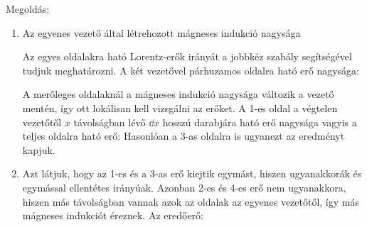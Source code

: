 
\ifdefined\megoldas

 Megoldás: 

 \begin{enumerate}[label=\alph*),itemsep=0pt]
  \item 
   Az egyenes vezető által létrehozott mágneses indukció nagysága
   
   Az egyes oldalakra ható Lorentz-erők irányát a jobbkéz szabály segítségével tudjuk meghatározni. A két vezetővel párhuzamos oldalra ható erő nagysága:
   
   A merőleges oldalaknál a mágneses indukció nagysága változik a vezető mentén, így ott lokálisan kell vizsgálni az erőket. A 1-es oldal a végtelen vezetőtől $x$ távolságban lévő $\dd x$ hosszú darabjára ható erő nagysága
   vagyis a teljes oldalra ható erő:
   Hasonlóan a 3-as oldalra is ugyanezt az eredményt kapjuk.
   
  \item
   Azt látjuk, hogy az 1-es és a 3-as erő kiejtik egymást, hiszen ugyanakkorák és egymással ellentétes irányúak. Azonban 2-es és 4-es erő nem ugyanakkora, hiszen más távolságban vannak azok az oldalak az egyenes vezetőtől, így más mágneses indukciót éreznek. Az eredőerő:
 \end{enumerate}

\fi